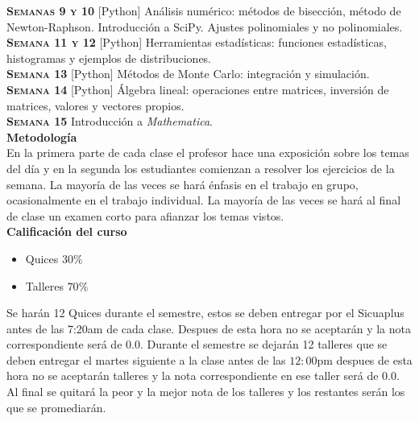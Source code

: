\documentclass[letterpaper,10pt,onecolumn]{article}
\begin{document}
\noindent\textbf{\textsc{Semanas 9 y 10}} [Python] Análisis numérico: métodos de bisección, método de Newton-Raphson. Introducción a SciPy. Ajustes polinomiales y no polinomiales.\\[-0.3cm]

\noindent\textbf{\textsc{Semana 11 y 12}} [Python] Herramientas estadísticas: funciones estadísticas, histogramas y ejemplos de distribuciones.\\[-0.3cm]

\noindent\textbf{\textsc{Semana 13}} [Python] Métodos de Monte Carlo: integración y simulación.\\[-0.3cm]

\noindent\textbf{\textsc{Semana 14}} [Python] Álgebra lineal: operaciones entre matrices, inversión de matrices, valores y vectores propios.\\[-0.3cm]

\noindent\textbf{\textsc{Semana 15}} Introducción a {\it Mathematica}.\\[+0.3cm]

\noindent\textbf{\large {} \quad Metodología}\\[-0.2cm]

\noindent\normalsize En la primera parte de cada clase el profesor hace una exposición sobre los temas del día y en la segunda los estudiantes comienzan a resolver los ejercicios de la semana. La mayoría de las veces se hará énfasis en el trabajo en grupo, ocasionalmente en el trabajo individual. La mayoría de las veces se hará al final de clase un examen corto para afianzar los temas vistos.\\[0.1cm]

\noindent\textbf{\large {} \quad Calificaci\'on del curso}\\[-0.2cm]

\begin{itemize}
	\item Quices $30\%$
	\item Talleres $70\%$
\end{itemize}
\noindent\normalsize Se har\'an 12 Quices durante el semestre, estos se deben entregar por el Sicuaplus antes de las 7:20am de cada clase. Despues de esta hora no se aceptar\'an y la nota
correspondiente ser\'a de $0.0$. Durante el semestre se dejar\'an 12 talleres que se deben entregar el martes siguiente a la clase antes de las $12:00$pm despues de esta hora no se aceptar\'an talleres y la nota correspondiente en ese taller ser\'a de $0.0$. Al final se quitar\'a la peor y la mejor nota de los talleres y los restantes ser\'an los que se promediar\'an. \\[0.1cm]
\end{document}
